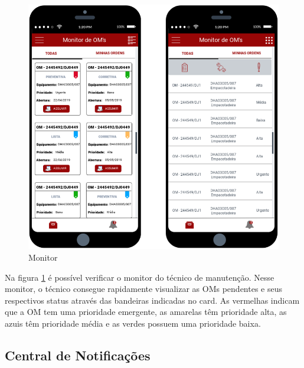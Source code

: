 \begin{figure}[H]
	\caption{\label{mobile_monitor}Monitor}
	\begin{center}
		\includegraphics[scale=0.75]{./Figuras/mobile/monitor.png}
	\end{center}
\end{figure}

Na figura \ref{mobile_monitor} é possível verificar o monitor do técnico de manutenção. Nesse monitor, o técnico consegue rapidamente visualizar as OMs pendentes e seus respectivos status através das bandeiras indicadas no card. As  vermelhas indicam que a OM tem uma prioridade emergente, as amarelas têm prioridade alta, as azuis têm prioridade média e as verdes possuem uma prioridade baixa.

\subsection{Central de Notificações}

